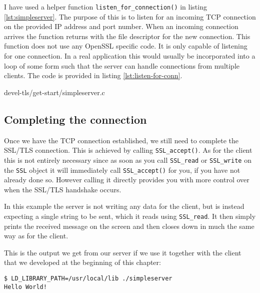 I have used a helper function \verb!listen_for_connection()! in listing 
\ref{lst:simpleserver}. The purpose of this is to listen for an incoming TCP 
connection on the provided IP address and port number. When an incoming 
connection arrives the function returns with the file descriptor for the new 
connection. This function does not use any OpenSSL specific code. It is only 
capable of listening for one connection. In a real application this would 
usually be incorporated into a loop of some form such that the server can 
handle connections from multiple clients. The code is provided in listing 
\ref{lst:listen-for-conn}.


{devel-tls/get-start/simpleserver.c}

\subsection{Completing the connection}

Once we have the TCP connection established, we still need to complete the 
SSL/TLS connection. This is achieved by calling \verb!SSL_accept()!. As for the 
client this is not entirely necessary since as soon as you call \verb!SSL_read! 
or \verb!SSL_write! on the \verb!SSL! object it will immediately call 
\verb!SSL_accept()! for you, if you have not already done so. However calling 
it directly provides you with more control over when the SSL/TLS handshake 
occurs.

In this example the server is not writing any data for the client, but is 
instead expecting a single string to be sent, which it reads using 
\verb!SSL_read!. It then simply prints the received message on the screen and 
then closes down in much the same way as for the client.

This is the output we get from our server if we use it together with the client 
that we developed at the beginning of this chapter:

\begin{verbatim}
$ LD_LIBRARY_PATH=/usr/local/lib ./simpleserver
Hello World!
\end{verbatim}


